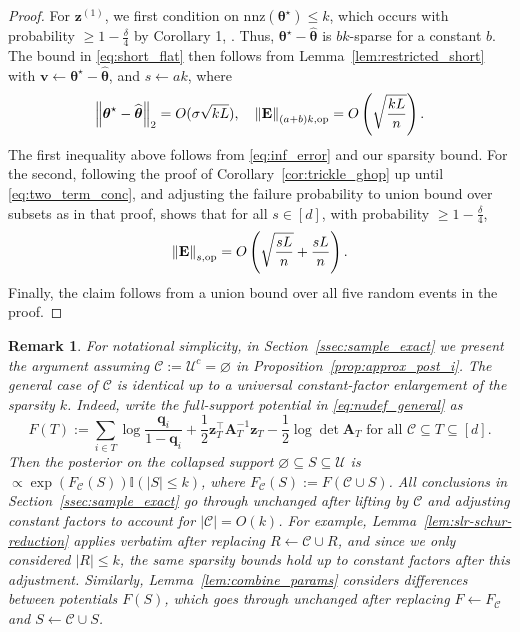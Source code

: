 \documentclass[11pt]{article}
\newtheorem{remark}{Remark}
\newcommand{\defeq}{:=}
\newcommand{\norm}[1]{\left\lVert#1\right\rVert}
\newcommand{\half}{\frac{1}{2}}
\newcommand{\1}{\mathbf{1}}
\newcommand{\0}{\mathbf{0}}
\newcommand{\ind}{\mathbb{I}}
\newcommand{\Par}[1]{\left(#1\right)}
\newcommand{\nnz}{\mathrm{nnz}}
\newcommand{\vth}{\boldsymbol{\theta}}
\newcommand{\sig}{\sigma}
\newcommand{\vths}{\vth^\star}
\newcommand{\vhth}{\widehat{\vth}}
\newcommand{\ma}{{\mathbf{A}}}
\newcommand{\me}{{\mathbf{E}}}
\newcommand{\normkop}[2]{{\left\lVert#1\right\rVert_{#2, \textup{op}}}}
\newcommand{\vq}{{\mathbf{q}}}
\newcommand{\vv}{{\mathbf{v}}}
\newcommand{\vz}{{\mathbf{z}}}
\newcommand{\calC}{{\mathcal{C}}}
\newcommand{\calU}{{\mathcal{U}}}
\renewcommand{\emptyset}{\varnothing}
\begin{document}
\begin{proof}
For $\vz^{(1)}$, we first condition on $\nnz(\vths) \le k$, which occurs with probability $\ge 1 - \frac \delta 4$ by Corollary 1, \cite{KumarSTZ25}. Thus, $\vths - \vhth$ is $bk$-sparse for a constant $b$. The bound in \eqref{eq:short_flat} then follows from Lemma~\ref{lem:restricted_short} with $\vv \gets \vths - \vhth$, and $s \gets ak$, where
\[\norm{\vths - \vhth}_2 = O(\sig\sqrt{kL}),\quad \normkop{\me}{(a + b)k} = O\Par{\sqrt{\frac{kL}{n}}}.\]
The first inequality above follows from \eqref{eq:inf_error} and our sparsity bound. For the second, following the proof of Corollary~\ref{cor:trickle_ghop} up until \eqref{eq:two_term_conc}, and adjusting the failure probability to union bound over subsets as in that proof, shows that for all $s \in [d]$, with probability $\ge 1 - \frac \delta 4$,
\begin{equation}\label{eq:kop_error}\normkop{\me}{s} = O\Par{\sqrt{\frac{sL}{n}} + \frac{sL}{n}}.\end{equation}
Finally, the claim follows from a union bound over all five random events in the proof.
\end{proof}

\begin{remark}\label{rem:slr_fixed_core}
For notational simplicity, in  Section~\ref{ssec:sample_exact} we present the argument assuming $\calC \defeq \calU^c = \emptyset$ in Proposition~\ref{prop:approx_post_i}. The general case of $\calC$ is identical up to a universal constant-factor enlargement of the sparsity $k$. Indeed, write the full-support potential in \eqref{eq:nudef_general} as
\[
    F(T)
    \defeq
    \sum_{i \in T}\log\frac{\vq_i}{1-\vq_i}
    +
    \half \vz_T^\top \ma_T^{-1}\vz_T
    -
    \half \log\det\ma_T \text{ for all } \calC \subseteq T \subseteq [d].
\]
Then the posterior on the collapsed support $\emptyset \subseteq S \subseteq \calU$ is $\propto \exp(F_\calC(S))\ind(|S| \le k)$, where $F_\calC(S) \defeq F(\calC \cup S)$. All conclusions in Section~\ref{ssec:sample_exact} go through unchanged after lifting by $\calC$ and adjusting constant factors to account for $|\calC| = O(k)$. For example, Lemma~\ref{lem:slr-schur-reduction} applies verbatim after replacing $R \gets \calC \cup R$, and since we only considered $|R| \le k$, the same sparsity bounds hold up to constant factors after this adjustment. Similarly, Lemma~\ref{lem:combine_params} considers differences between potentials $F(S)$, which goes through unchanged after replacing $F \gets F_{\calC}$ and $S \gets \calC \cup S$. 
\end{remark}
\end{document}
